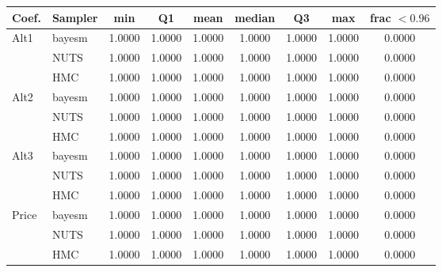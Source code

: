 \begin{tabular}{llccccccc}
\toprule
Coef. & Sampler & min & Q1 & mean & median & Q3 & max & frac $<0.96$ \\
\midrule
Alt1 & bayesm & 1.0000 & 1.0000 & 1.0000 & 1.0000 & 1.0000 & 1.0000 & 0.0000 \\
 & NUTS & 1.0000 & 1.0000 & 1.0000 & 1.0000 & 1.0000 & 1.0000 & 0.0000 \\
 & HMC & 1.0000 & 1.0000 & 1.0000 & 1.0000 & 1.0000 & 1.0000 & 0.0000 \\
Alt2 & bayesm & 1.0000 & 1.0000 & 1.0000 & 1.0000 & 1.0000 & 1.0000 & 0.0000 \\
 & NUTS & 1.0000 & 1.0000 & 1.0000 & 1.0000 & 1.0000 & 1.0000 & 0.0000 \\
 & HMC & 1.0000 & 1.0000 & 1.0000 & 1.0000 & 1.0000 & 1.0000 & 0.0000 \\
Alt3 & bayesm & 1.0000 & 1.0000 & 1.0000 & 1.0000 & 1.0000 & 1.0000 & 0.0000 \\
 & NUTS & 1.0000 & 1.0000 & 1.0000 & 1.0000 & 1.0000 & 1.0000 & 0.0000 \\
 & HMC & 1.0000 & 1.0000 & 1.0000 & 1.0000 & 1.0000 & 1.0000 & 0.0000 \\
Price & bayesm & 1.0000 & 1.0000 & 1.0000 & 1.0000 & 1.0000 & 1.0000 & 0.0000 \\
 & NUTS & 1.0000 & 1.0000 & 1.0000 & 1.0000 & 1.0000 & 1.0000 & 0.0000 \\
 & HMC & 1.0000 & 1.0000 & 1.0000 & 1.0000 & 1.0000 & 1.0000 & 0.0000 \\
\bottomrule
\end{tabular}
